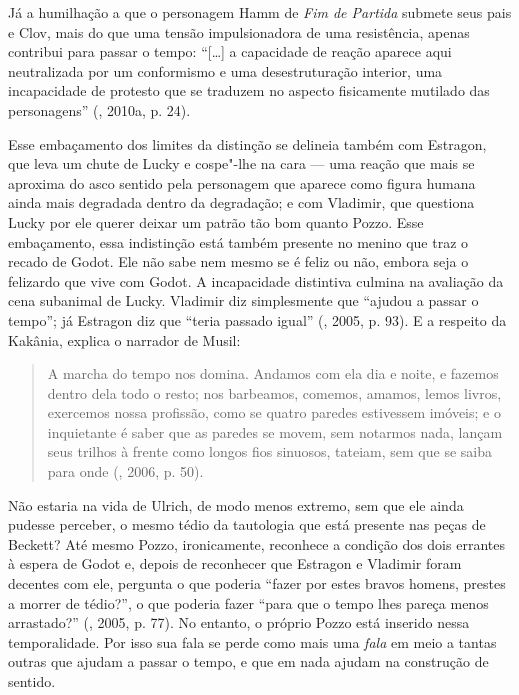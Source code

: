 Já a humilhação a que o personagem Hamm de \emph{Fim de Partida} submete
seus pais e Clov, mais do que uma tensão impulsionadora de uma
resistência, apenas contribui para passar o tempo: ``[\ldots{}] a
capacidade de reação aparece aqui neutralizada por um conformismo e uma
desestruturação interior, uma incapacidade de protesto que se traduzem
no aspecto fisicamente mutilado das personagens'' (, 2010a, p.
24).

Esse embaçamento dos limites da distinção se delineia também com
Estragon, que leva um chute de Lucky e cospe"-lhe na cara --- uma reação
que mais se aproxima do asco sentido pela personagem que aparece como
figura humana ainda mais degradada dentro da degradação; e com Vladimir,
que questiona Lucky por ele querer deixar um patrão tão bom quanto
Pozzo. Esse embaçamento, essa indistinção está também presente no menino
que traz o recado de Godot. Ele não sabe nem mesmo se é feliz ou não,
embora seja o felizardo que vive com Godot. A incapacidade distintiva
culmina na avaliação da cena subanimal de Lucky. Vladimir diz
simplesmente que ``ajudou a passar o tempo''; já Estragon diz que
``teria passado igual'' (, 2005, p. 93). E a respeito da Kakânia,
explica o narrador de Musil:

\begin{quote}
A marcha do tempo nos domina. Andamos com ela dia e noite, e fazemos
dentro dela todo o resto; nos barbeamos, comemos, amamos, lemos livros,
exercemos nossa profissão, como se quatro paredes estivessem imóveis; e
o inquietante é saber que as paredes se movem, sem notarmos nada, lançam
seus trilhos à frente como longos fios sinuosos, tateiam, sem que se
saiba para onde (, 2006, p. 50).
\end{quote}

Não estaria na vida de Ulrich, de modo menos extremo, sem que ele ainda
pudesse perceber, o mesmo tédio da tautologia que está presente nas
peças de Beckett? Até mesmo Pozzo, ironicamente, reconhece a condição
dos dois errantes à espera de Godot e, depois de reconhecer que Estragon
e Vladimir foram decentes com ele, pergunta o que poderia ``fazer por
estes bravos homens, prestes a morrer de tédio?'', o que poderia fazer
``para que o tempo lhes pareça menos arrastado?'' (, 2005, p.
77). No entanto, o próprio Pozzo está inserido nessa temporalidade. Por
isso sua fala se perde como mais uma \emph{fala} em meio a tantas outras
que ajudam a passar o tempo, e que em nada ajudam na construção de
sentido.

